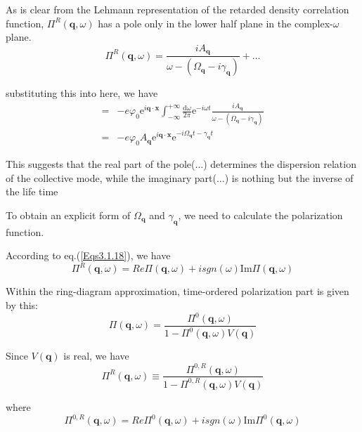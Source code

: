 As is clear from the Lehmann representation of the retarded density correlation function, $\Pi^R(\mathbf{q},\omega)$ has a pole only in the lower half plane in the complex-$\omega$ plane.
\begin{equation} \label{Eqs3.2.5}
\Pi^R(\mathbf{q},\omega) = \frac{i A_{\mathbf{q}}}{\omega - (\Omega_{\mathbf{q}}-i \gamma_{\mathbf{q}})} + \ldots
\end{equation}

substituting this into here, we have
\begin{equation} \label{Eqs3.2.6} \begin{split}
=& - e \varphi_0 \mathrm{e}^{i \mathbf{q} \cdot \mathbf{x}} \int_{-\infty}^{+\infty} \frac{\mathrm{d}\omega}{2\pi}\mathrm{e}^{-i \omega t} \frac{i A_{\mathbf{q}}}{\omega - (\Omega_{\mathbf{q}}-i \gamma_{\mathbf{q}})}\\
=& - e \varphi_0 A_{\mathbf{q}} \mathrm{e}^{i \mathbf{q} \cdot \mathbf{x}} \mathrm{e}^{-i \Omega_{\mathbf{q}} t - \gamma_{\mathbf{q}} t}
\end{split}\end{equation}

This suggests that the real part of the pole($\ldots$) determines the dispersion relation of the collective mode, while the imaginary part($\ldots$) is nothing but the inverse of the life time

To obtain an explicit form of $\Omega_{\mathbf{q}}$ and $\gamma_{\mathbf{q}}$, we need to calculate the polarization function.

According to eq.(\ref{Eqs3.1.18}), we have
\[\Pi^R(\mathbf{q},\omega) = Re\Pi(\mathbf{q},\omega) + i sgn(\omega) \text{Im} \Pi(\mathbf{q},\omega)\]

Within the ring-diagram approximation, time-ordered polarization part is given by this:
\begin{equation*} \label{Eqs2.8.5''} \tag{2.8.5''} \Pi(\mathbf{q},\omega) = \frac{\Pi^{0}(\mathbf{q},\omega)}{1-\Pi^{0}(\mathbf{q},\omega) V(\mathbf{q})} \end{equation*}

Since $V(\mathbf{q})$ is real, we have
\begin{equation} \label{Eqs3.2.7}
\Pi^R(\mathbf{q},\omega) \equiv \frac{\Pi^{0,R}(\mathbf{q},\omega)}{1-\Pi^{0,R}(\mathbf{q},\omega)V(\mathbf{q})}
\end{equation}

where
\[\Pi^{0,R}(\mathbf{q},\omega) = Re\Pi^0(\mathbf{q},\omega) + i sgn(\omega) \text{Im} \Pi^0(\mathbf{q},\omega)\]

